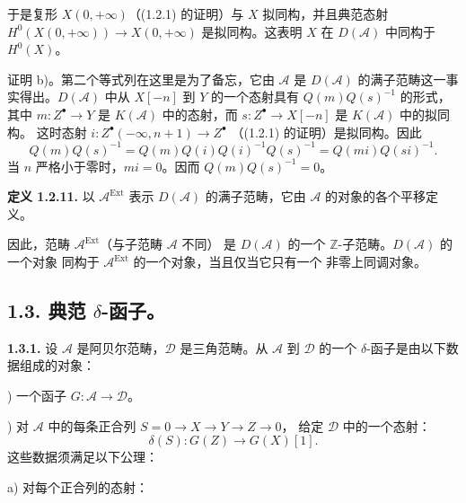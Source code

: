 \clearpage
{}%
\begingroup\small\setlength{\parskip}{0pt}\setlength{\emergencystretch}{1.5em}
\setlength{\abovedisplayskip}{4pt plus 2pt minus 2pt}%
\setlength{\belowdisplayskip}{4pt plus 2pt minus 2pt}%

于是复形 $X(0,+\infty)$（(1.2.1) 的证明）与 $X$ 拟同构，并且典范态射
$H^0(X(0,+\infty))\longrightarrow X(0,+\infty)$ 是拟同构。这表明 $X$ 在
$D(\mathcal A)$ 中同构于 $H^0(X)$。

证明 b)。第二个等式列在这里是为了备忘，它由 $\mathcal A$ 是
$D(\mathcal A)$ 的满子范畴这一事实得出。$D(\mathcal A)$ 中从 $X[-n]$ 到
$Y$ 的一个态射具有 $Q(m)Q(s)^{-1}$ 的形式，其中
$m\colon Z^\bullet\longrightarrow Y$ 是 $K(\mathcal A)$ 中的态射，而
$s\colon Z^\bullet\longrightarrow X[-n]$ 是 $K(\mathcal A)$ 中的拟同构。
这时态射 $i\colon Z^\bullet(-\infty,n+1)\longrightarrow Z^\bullet$
（(1.2.1) 的证明）是拟同构。因此
\[
Q(m)Q(s)^{-1}=Q(m)Q(i)Q(i)^{-1}Q(s)^{-1}=Q(mi)Q(si)^{-1}.
\]
当 $n$ 严格小于零时，$mi=0$。因而 $Q(m)Q(s)^{-1}=0$。

\medskip\noindent\textbf{定义 1.2.11.}\quad
以 $\mathcal A^{\operatorname{Ext}}$ 表示 $D(\mathcal A)$ 的满子范畴，它由
$\mathcal A$ 的对象的各个平移定义。

因此，范畴 $\mathcal A^{\operatorname{Ext}}$（与子范畴 $\mathcal A$ 不同）
是 $D(\mathcal A)$ 的一个 $\mathbb Z$-子范畴。$D(\mathcal A)$ 的一个对象
同构于 $\mathcal A^{\operatorname{Ext}}$ 的一个对象，当且仅当它只有一个
非零上同调对象。

\subsection*{1.3. 典范 \texorpdfstring{$\delta$}{delta}-函子。}

\noindent\textbf{1.3.1.}\quad
设 $\mathcal A$ 是阿贝尔范畴，$\mathcal D$ 是三角范畴。从 $\mathcal A$
到 $\mathcal D$ 的一个 $\delta$-函子是由以下数据组成的对象：

) 一个函子 $G\colon\mathcal A\longrightarrow\mathcal D$。

) 对 $\mathcal A$ 中的每条正合列
$S=0\longrightarrow X\longrightarrow Y\longrightarrow Z\longrightarrow0$，
给定 $\mathcal D$ 中的一个态射：
\[
\delta(S)\colon G(Z)\longrightarrow G(X)[1].
\]
这些数据须满足以下公理：

\noindent a) 对每个正合列的态射：

\begin{center}
\end{center}
\endgroup
